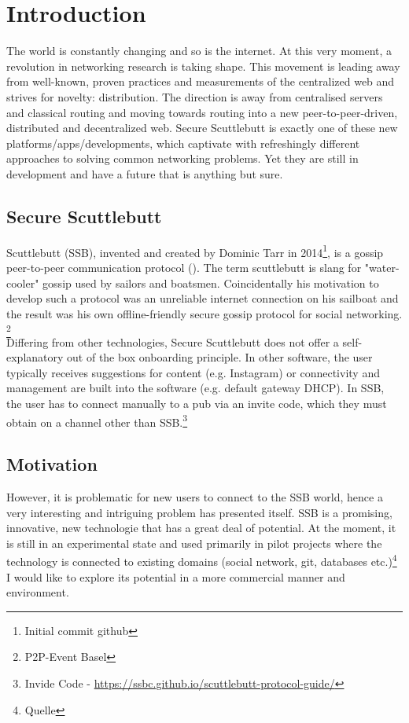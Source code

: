 \chapter{Introduction}
The world is constantly changing and so is the internet. At this very moment, a revolution in networking research is taking shape. This movement is leading away from well-known, proven practices and measurements of the centralized web and strives for novelty: distribution. The direction is away from centralised servers and classical routing and moving towards routing into a new peer-to-peer-driven, distributed and decentralized web. Secure Scuttlebutt is exactly one of these new platforms/apps/developments, which captivate with refreshingly different approaches to solving common networking problems. Yet they are still in development and have a future that is anything but sure. 
\section{Secure Scuttlebutt}
Scuttlebutt (SSB), invented and created by Dominic Tarr in 2014\footnote{Initial commit github}, is a gossip peer-to-peer communication protocol (\citet{tarr2019secure}). The term scuttlebutt is slang for "water-cooler" gossip used by sailors and boatsmen. Coincidentally his motivation to develop such a protocol was an unreliable internet connection on his sailboat and the result was his own offline-friendly secure gossip protocol for social networking. \footnote{P2P-Event Basel}\\

Differing from other technologies, Secure Scuttlebutt does not offer a self-explanatory out of the box onboarding principle. In other software, the user typically receives suggestions for content (e.g. Instagram) or connectivity and management are built into the software (e.g. default gateway DHCP). In SSB, the user has to connect manually to a pub via an invite code, which they must obtain on a channel other than SSB.\footnote{Invide Code - \url{https://ssbc.github.io/scuttlebutt-protocol-guide/}} 

\section{Motivation}
However, it is problematic for new users to connect to the SSB world, hence a very interesting and intriguing problem has presented itself. SSB is a promising, innovative, new technologie that has a great deal of potential. At the moment, it is still in an experimental state and used primarily in pilot projects where the technology is connected to existing domains (social network, git, databases etc.)\footnote{Quelle} I would like to explore its potential in a more commercial manner and environment. 

